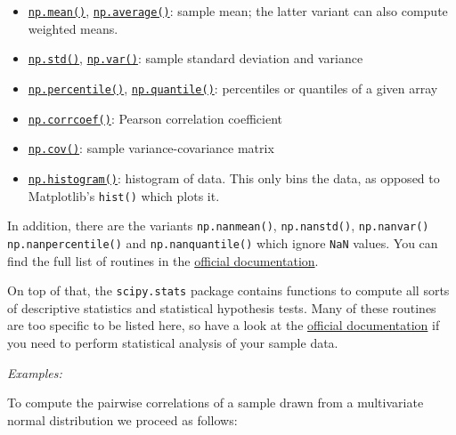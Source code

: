 \documentclass{scrartcl}
\providecommand{\tightlist}{%
      \setlength{\itemsep}{0pt}\setlength{\parskip}{0pt}}
\begin{document}
\begin{itemize}
\tightlist
\item
  \href{https://numpy.org/doc/stable/reference/generated/numpy.mean.html}{\texttt{np.mean()}},
  \href{https://numpy.org/doc/stable/reference/generated/numpy.average.html}{\texttt{np.average()}}:
  sample mean; the latter variant can also compute weighted means.
\item
  \href{https://numpy.org/doc/stable/reference/generated/numpy.std}{\texttt{np.std()}},
  \href{https://numpy.org/doc/stable/reference/generated/numpy.var.html}{\texttt{np.var()}}:
  sample standard deviation and variance
\item
  \href{https://numpy.org/doc/stable/reference/generated/numpy.percentile.html}{\texttt{np.percentile()}},
  \href{https://numpy.org/doc/stable/reference/generated/numpy.quantile.html}{\texttt{np.quantile()}}:
  percentiles or quantiles of a given array
\item
  \href{https://numpy.org/doc/stable/reference/generated/numpy.corrcoef.html}{\texttt{np.corrcoef()}}:
  Pearson correlation coefficient
\item
  \href{https://numpy.org/doc/stable/reference/generated/numpy.cov.html}{\texttt{np.cov()}}:
  sample variance-covariance matrix
\item
  \href{https://numpy.org/doc/stable/reference/generated/numpy.histogram.html}{\texttt{np.histogram()}}:
  histogram of data. This only bins the data, as opposed to Matplotlib's
  \texttt{hist()} which plots it.
\end{itemize}

In addition, there are the variants \texttt{np.nanmean()},
\texttt{np.nanstd()}, \texttt{np.nanvar()} \texttt{np.nanpercentile()}
and \texttt{np.nanquantile()} which ignore \texttt{NaN} values. You can
find the full list of routines in the
\href{https://numpy.org/doc/stable/reference/routines.statistics.html}{official
documentation}.

On top of that, the \texttt{scipy.stats} package contains functions to
compute all sorts of descriptive statistics and statistical hypothesis
tests. Many of these routines are too specific to be listed here, so
have a look at the
\href{https://docs.scipy.org/doc/scipy/reference/stats.html\#summary-statistics}{official
documentation} if you need to perform statistical analysis of your
sample data.

    \emph{Examples:}

To compute the pairwise correlations of a sample drawn from a
multivariate normal distribution we proceed as follows:
\end{document}
